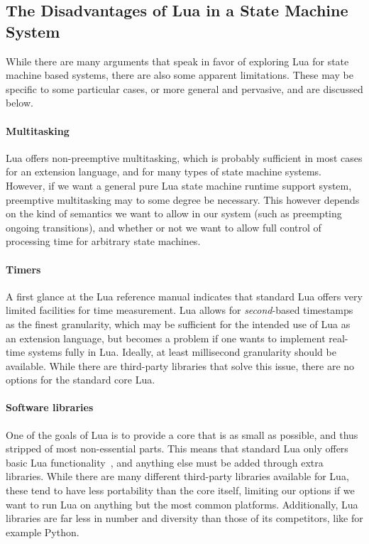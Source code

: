 \subsection{The Disadvantages of Lua in a State Machine System}
\label{sec:lua_disadvantages}
While there are many arguments that speak in favor of exploring Lua for state machine based systems, there are also some apparent limitations. These may be specific to some particular cases, or more general and pervasive, and are discussed below.

\paragraph{Multitasking}
Lua offers non-preemptive multitasking, which is probably sufficient in most cases for an extension language, and for many types of state machine systems. However, if we want a general pure Lua state machine runtime support system, preemptive multitasking may to some degree be necessary. This however depends on the kind of semantics we want to allow in our system (such as preempting ongoing transitions), and whether or not we want to allow full control of processing time for arbitrary state machines.

\paragraph{Timers}
A first glance at the Lua reference manual indicates that standard Lua offers very limited facilities for time measurement. Lua allows for \emph{second}-based timestamps as the finest granularity, which may be sufficient for the intended use of Lua as an extension language, but becomes a problem if one wants to implement real-time systems fully in Lua. Ideally, at least millisecond granularity should be available. While there are third-party libraries that solve this issue, there are no options for the standard core Lua.

\paragraph{Software libraries}
One of the goals of Lua is to provide a core that is as small as possible, and thus stripped of most non-essential parts. This means that standard Lua only offers basic Lua functionality~\cite[Ch.6]{manual:lua_reference_manual}, and anything else must be added through extra libraries. While there are many different third-party libraries available for Lua, these tend to have less portability than the core itself, limiting our options if we want to run Lua on anything but the most common platforms. Additionally, Lua libraries are far less in number and diversity than those of its competitors, like for example Python.

